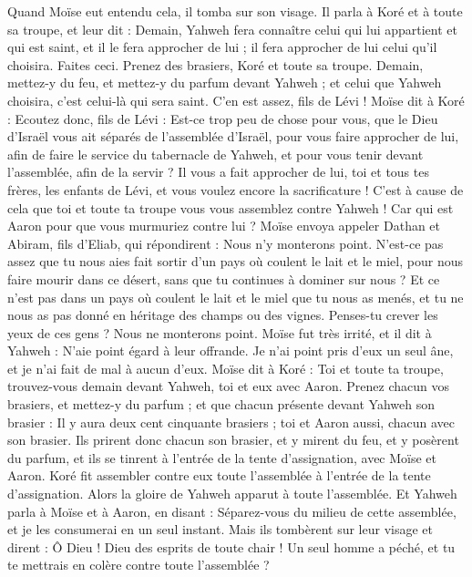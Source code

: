 \begin{multicols}{2}
Quand Moïse eut entendu cela, il tomba sur son visage.
Il parla à Koré et à toute sa troupe, et leur dit : Demain, Yahweh fera connaître celui qui lui appartient et qui est saint, et il le fera approcher de lui ; il fera approcher de lui celui qu'il choisira.
Faites ceci. Prenez des brasiers, Koré et toute sa troupe.
Demain, mettez-y du feu, et mettez-y du parfum devant Yahweh ; et celui que Yahweh choisira, c’est celui-là qui sera saint. C’en est assez, fils de Lévi !
Moïse dit à Koré : Ecoutez donc, fils de Lévi :
Est-ce trop peu de chose pour vous, que le Dieu d’Israël vous ait séparés de l’assemblée d’Israël, pour vous faire approcher de lui, afin de faire le service du tabernacle de Yahweh, et pour vous tenir devant l’assemblée, afin de la servir ?
Il vous a fait approcher de lui, toi et tous tes frères, les enfants de Lévi, et vous voulez encore la sacrificature !
C'est à cause de cela que toi et toute ta troupe vous vous assemblez contre Yahweh ! Car qui est Aaron pour que vous murmuriez contre lui ?
Moïse envoya appeler Dathan et Abiram, fils d'Eliab, qui répondirent : Nous n’y monterons point.
N’est-ce pas assez que tu nous aies fait sortir d'un pays où coulent le lait et le miel, pour nous faire mourir dans ce désert, sans que tu continues à dominer sur nous ?
Et ce n’est pas dans un pays où coulent le lait et le miel que tu nous as menés, et tu ne nous as pas donné en héritage des champs ou des vignes. Penses-tu crever les yeux de ces gens ? Nous ne monterons point.
Moïse fut très irrité, et il dit à Yahweh : N’aie point égard à leur offrande. Je n'ai point pris d'eux un seul âne, et je n'ai fait de mal à aucun d'eux.
Moïse dit à Koré : Toi et toute ta troupe, trouvez-vous demain devant Yahweh, toi et eux avec Aaron.
Prenez chacun vos brasiers, et mettez-y du parfum ; et que chacun présente devant Yahweh son brasier : Il y aura deux cent cinquante brasiers ; toi et Aaron aussi, chacun avec son brasier.
Ils prirent donc chacun son brasier, et y mirent du feu, et y posèrent du parfum, et ils se tinrent à l'entrée de la tente d'assignation, avec Moïse et Aaron.
Koré fit assembler contre eux toute l'assemblée à l'entrée de la tente d'assignation. Alors la gloire de Yahweh apparut à toute l'assemblée.
Et Yahweh parla à Moïse et à Aaron, en disant :
Séparez-vous du milieu de cette assemblée, et je les consumerai en un seul instant.
Mais ils tombèrent sur leur visage et dirent : Ô Dieu ! Dieu des esprits de toute chair ! Un seul homme a péché, et tu te mettrais en colère contre toute l'assemblée ?

\end{multicols}
